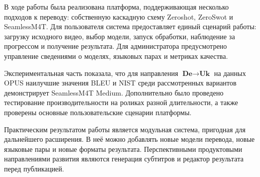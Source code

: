 \documentclass[a4paper,article,14pt]{extarticle}
\begin{document}
В ходе работы была реализована платформа, поддерживающая несколько подходов к переводу: собственную каскадную схему Zeroshot, ZeroSwot и SeamlessM4T. Для пользователя система предоставляет единый сценарий работы: загрузку исходного видео, выбор модели, запуск обработки, наблюдение за прогрессом и получение результата. Для администратора предусмотрено управление сведениями о моделях, языковых парах и метриках качества.

Экспериментальная часть показала, что для направления $\textbf{De}\!\rightarrow\!\textbf{Uk}$ на данных OPUS наилучшие значения BLEU и NIST среди рассмотренных вариантов демонстрирует SeamlessM4T Medium. Дополнительно было проведено тестирование производительности на роликах разной длительности, а также проверены основные пользовательские сценарии платформы.

Практическим результатом работы является модульная система, пригодная для дальнейшего расширения. В неё можно добавлять новые модели перевода, новые языковые пары и новые форматы результата. Перспективными продуктовыми направлениями развития являются генерация субтитров и редактор результата перед публикацией.
\end{document}
